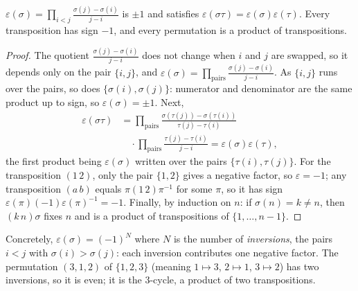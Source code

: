 \begin{lemma}\label{lem:sign}
$\varepsilon(\sigma)=\prod_{i<j}\frac{\sigma(j)-\sigma(i)}{j-i}$ is $\pm1$ and satisfies $\varepsilon(\sigma\tau)=\varepsilon(\sigma)\varepsilon(\tau)$. Every transposition has sign $-1$, and every permutation is a product of transpositions.
\end{lemma}
\begin{proof}
The quotient $\frac{\sigma(j)-\sigma(i)}{j-i}$ does not change when $i$ and $j$ are swapped, so it depends only on the pair $\{i,j\}$, and $\varepsilon(\sigma)=\prod_{\text{pairs}}\frac{\sigma(j)-\sigma(i)}{j-i}$. As $\{i,j\}$ runs over the pairs, so does $\{\sigma(i),\sigma(j)\}$: numerator and denominator are the same product up to sign, so $\varepsilon(\sigma)=\pm1$. Next,
\[
\begin{aligned}\varepsilon(\sigma\tau)&=\prod_{\text{pairs}}\frac{\sigma(\tau(j))-\sigma(\tau(i))}{\tau(j)-\tau(i)}\\&\quad\cdot\prod_{\text{pairs}}\frac{\tau(j)-\tau(i)}{j-i}=\varepsilon(\sigma)\varepsilon(\tau),\end{aligned}
\]
the first product being $\varepsilon(\sigma)$ written over the pairs $\{\tau(i),\tau(j)\}$. For the transposition $(1\,2)$, only the pair $\{1,2\}$ gives a negative factor, so $\varepsilon=-1$; any transposition $(a\,b)$ equals $\pi(1\,2)\pi^{-1}$ for some $\pi$, so it has sign $\varepsilon(\pi)(-1)\varepsilon(\pi)^{-1}=-1$. Finally, by induction on $n$: if $\sigma(n)=k\ne n$, then $(k\,n)\sigma$ fixes $n$ and is a product of transpositions of $\{1,\dots,n-1\}$.
\end{proof}

Concretely, $\varepsilon(\sigma)=(-1)^{N}$ where $N$ is the number of \emph{inversions}, the pairs $i<j$ with $\sigma(i)>\sigma(j)$: each inversion contributes one negative factor. The permutation $(3,1,2)$ of $\{1,2,3\}$ (meaning $1\mapsto3$, $2\mapsto1$, $3\mapsto2$) has two inversions, so it is even; it is the $3$-cycle, a product of two transpositions.

